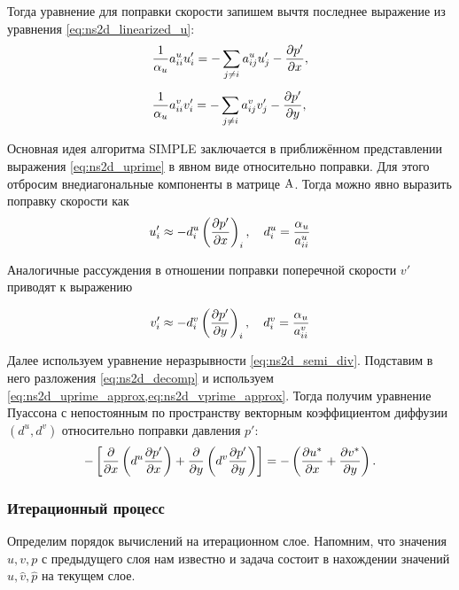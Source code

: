 Тогда уравнение для поправки скорости запишем вычтя последнее выражение из
уравнения \eqref{eq:ns2d_linearized_u}:
\begin{align}
  \label{eq:ns2d_uprime}
  &\frac{1}{\alpha_u} a^u_{ii} u'_i = -\sum_{j\neq i} a^u_{ij} u'_j - \frac{\partial p'}{\partial x}, \\[5pt]
  \label{eq:ns2d_vprime}
  &\frac{1}{\alpha_u} a^v_{ii} v'_i = -\sum_{j\neq i} a^v_{ij} v'_j - \frac{\partial p'}{\partial y},
\end{align}

Основная идея алгоритма SIMPLE заключается в приближённом представлении выражения \eqref{eq:ns2d_uprime}
в явном виде относительно поправки. Для этого отбросим внедиагональные компоненты в матрице ${\rm A}$.
Тогда можно явно выразить поправку скорости как
\begin{equation}
    \label{eq:ns2d_uprime_approx}
    u'_i \approx -d^u_i \left(\frac{\partial p'}{\partial x}\right)_i, \quad d^u_i = \frac{\alpha_u}{a^u_{ii}}
\end{equation}

Аналогичные рассуждения в отношении поправки поперечной скорости $v'$ приводят к выражению

\begin{equation}
    \label{eq:ns2d_vprime_approx}
    v'_i \approx -d^v_i \left(\frac{\partial p'}{\partial y}\right)_i, \quad d^v_i = \frac{\alpha_u}{a^v_{ii}}
\end{equation}

Далее используем уравнение неразрывности \cref{eq:ns2d_semi_div}. Подставим
в него разложения \cref{eq:ns2d_decomp} и используем
\cref{eq:ns2d_uprime_approx,eq:ns2d_vprime_approx}.
Тогда
получим уравнение Пуассона с непостоянным по пространству векторным коэффициентом диффузии $\left(d^u, d^v\right)$
относительно поправки давления $p'$:
\begin{equation}
    \label{eq:ns2d_pprime_diff}
    -\left[
    \frac{\partial }{\partial x}\left(
       d^u \frac{\partial p'}{\partial x} 
            \right)
    +\frac{\partial }{\partial y}\left(
       d^v \frac{\partial p'}{\partial y} 
            \right)
    \right]
    =
    -\left(\frac{\partial u^*}{\partial x} + \frac{\partial v^*}{\partial y}\right).
\end{equation}

\subsubsection{Итерационный процесс}
Определим порядок вычислений на итерационном слое.
Напомним, что значения $u, v, p$ с
предыдущего слоя нам известно и задача
состоит в нахождении значений $\hat u, \hat v, \hat p$
на текущем слое.

